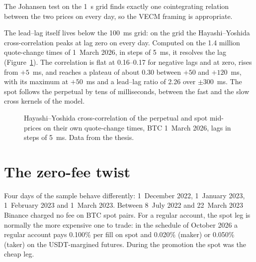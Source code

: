 \documentclass[a4paper,11pt]{article}
\begin{document}
The Johansen test on the 1~s grid finds exactly one cointegrating relation between the two prices on every day, so the VECM framing is appropriate.

The lead--lag itself lives below the 100~ms grid: on the grid the Hayashi--Yoshida cross-correlation peaks at lag zero on every day. Computed on the 1.4 million quote-change times of 1~March 2026, in steps of 5~ms, it resolves the lag (Figure~\ref{fig:hy}). The correlation is flat at 0.16--0.17 for negative lags and at zero, rises from $+5$~ms, and reaches a plateau of about 0.30 between $+50$ and $+120$~ms, with its maximum at $+50$~ms and a lead--lag ratio of 2.26 over $\pm300$~ms. The spot follows the perpetual by tens of milliseconds, between the fast and the slow cross kernels of the model.

\begin{figure}[htbp]
\centering
{}
\caption{Hayashi--Yoshida cross-correlation of the perpetual and spot mid-prices on their own quote-change times, BTC 1~March 2026, lags in steps of 5~ms. Data from the thesis.}
\label{fig:hy}
\end{figure}

\section{The zero-fee twist}

Four days of the sample behave differently: 1~December 2022, 1~January 2023, 1~February 2023 and 1~March 2023. Between 8~July 2022 and 22~March 2023 Binance charged no fee on BTC spot pairs. For a regular account, the spot leg is normally the more expensive one to trade: in the schedule of October 2026 a regular account pays 0.100\% per fill on spot and 0.020\% (maker) or 0.050\% (taker) on the USDT-margined futures. During the promotion the spot was the cheap leg.
\end{document}
